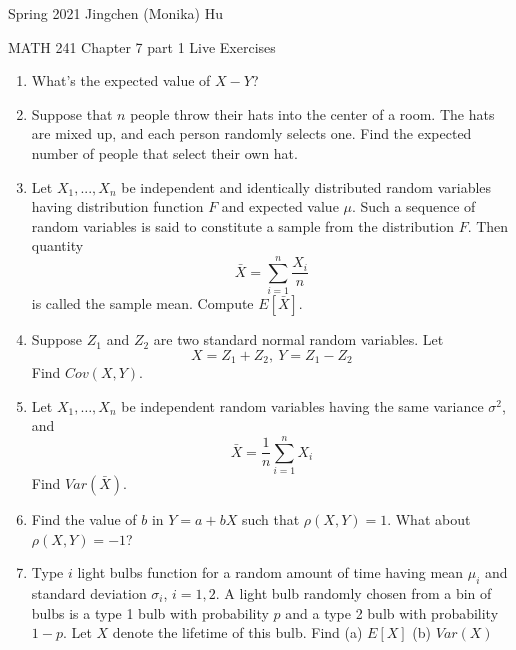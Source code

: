 \documentclass[11pt]{article}
\begin{document}
\enlargethispage{\baselineskip}

Spring 2021 \hfill Jingchen (Monika) Hu\\

\begin{center}
{\huge MATH 241 Chapter 7 part 1 Live Exercises}	\\
\end{center}
\vspace{0.5cm}

\begin{enumerate}


\item What's the expected value of $X-Y$?

\item Suppose that $n$ people throw their hats into the center of a room. The hats are mixed up, and each person randomly selects one. Find the expected number of people that select their own hat.

\item Let $X_1, ..., X_n$ be independent and identically distributed random variables having distribution function $F$ and expected value $\mu$. Such a sequence of random variables is said to constitute a sample from the distribution $F$. Then quantity
$$\bar{X} = \sum_{i=1}^n\frac{X_i}{n}$$
is called the sample mean. Compute $E[\bar{X}]$.

\item Suppose $Z_1$ and $Z_2$ are two standard normal random variables. Let
\[X = Z_1 + Z_2, ~ Y = Z_1 - Z_2\]
Find $Cov(X, Y)$.

\item Let $X_1, \ldots, X_n$ be independent random variables having the same variance $\sigma^2$, and
\[\bar{X} = \frac{1}{n} \sum_{i = 1}^n X_i\]
Find $Var(\bar{X})$.

\item Find the value of $b$ in $Y = a + bX$ such that $\rho(X, Y) = 1$. What about $\rho(X, Y) = -1$?


\item Type $i$ light bulbs function for a random amount of time having mean $\mu_i$ and standard deviation $\sigma_i$, $i = 1, 2$. A light bulb randomly chosen from a bin of bulbs is a type 1 bulb with probability $p$ and a type 2 bulb with probability $1 - p$. Let $X$ denote the lifetime of this bulb. Find (a) $E[X]$ (b) $Var(X)$

\end{enumerate}
\end{document}
